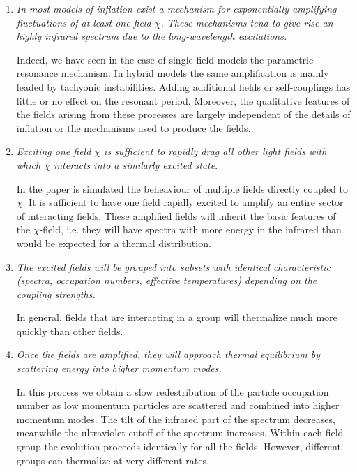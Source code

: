 \documentclass[11pt,a4paper,twoside]{book}
\begin{document}
\begin{enumerate}
	\item \textit{In most models of inflation exist a mechanism for exponentially amplifying fluctuations of at least one field $\chi$. These mechanisms tend to give rise an highly infrared spectrum due to the long-wavelength excitations.}
	
	Indeed, we have seen in the case of single-field models the parametric resonance mechanism. In hybrid models the same amplification is mainly leaded by tachyonic instabilities. Adding additional fields or self-couplings has little or no effect on the resonant period. Moreover, the qualitative features of the fields arising from these processes are largely independent of the details of inflation or the mechanisms used to produce the fields.
	
	\item \textit{Exciting one field $\chi$ is sufficient to rapidly drag all other light fields with which $\chi$ interacts into a similarly excited state}. 
	
	In the paper is simulated the beheaviour of multiple fields directly coupled to $\chi$. It is sufficient to have one field rapidly excited to amplify an entire sector of interacting fields. These  amplified fields will inherit the basic features of the $\chi$-field, i.e. they will have spectra with more energy in the infrared than would be expected for a thermal distribution.
	
	\item \textit{The excited fields will be grouped into subsets with identical characteristic (spectra, occupation numbers, effective temperatures) depending on the coupling strengths.}
	
	In general, fields  that are interacting in a group will thermalize much more quickly than other fields. 
	
	\item \textit{Once the fields are amplified, they will approach thermal equilibrium by scattering energy into higher momentum modes.}
	
	In this process we obtain a slow redestribution of the particle occupation number as low momentum particles are scattered and combined into higher momentum modes. The tilt of the infrared part of the spectrum decreases, meanwhile the ultraviolet cutoff of the spectrum increases. Within each field group the evolution proceeds identically for all the fields. However, different groups can thermalize at very different rates.
\end{enumerate}
\end{document}
